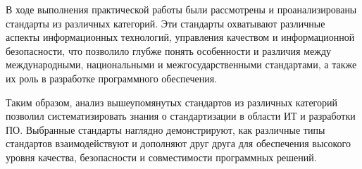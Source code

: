 В ходе выполнения практической работы были рассмотрены
и проанализированы стандарты из различных категорий.
Эти стандарты охватывают различные аспекты информационных технологий,
управления качеством и информационной безопасности,
что позволило глубже понять особенности и различия между международными,
национальными и межгосударственными стандартами,
а также их роль в разработке программного обеспечения.

Таким образом, анализ вышеупомянутых стандартов
из различных категорий позволил систематизировать знания о стандартизации
в области ИТ и разработки ПО. Выбранные стандарты наглядно демонстрируют,
как различные типы стандартов взаимодействуют
и дополняют друг друга для обеспечения высокого уровня качества,
безопасности и совместимости программных решений.
